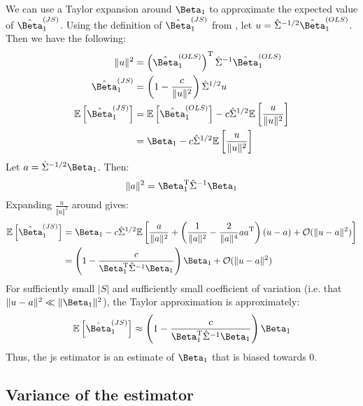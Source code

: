 We can use a Taylor expansion around $\Beta_1$ to approximate the expected value of $\hat{\Beta}_1^{(JS)}$.
Using the definition of $\hat{\Beta}_1^{(JS)}$ from , let $u = \hat{\Sigma}^{-1/2}\hat{\Beta}_1^{(OLS)}$.
Then we have the following:
%
\begin{align}
  \Vert u \Vert ^2                & = \left( \hat{\Beta}_1^{(OLS)} \right) ^\tran \hat{\Sigma}^{-1} \hat{\Beta}_1^{(OLS)}          \\
  \hat{\Beta}_1^{(JS)}            & = \left( 1 - \frac{c}{\Vert u \Vert ^2} \right) \hat{\Sigma}^{1/2} u                           \\
  \expect{ \hat{\Beta}_1^{(JS)} } & = \expect{ \hat{\Beta}_1^{(OLS)} } - c\hat{\Sigma}^{1/2} \expect{ \frac{u}{\Vert u \Vert ^2} } \\
                                  & = \Beta_1 - c\hat{\Sigma}^{1/2}\expect{ \frac{u}{\Vert u \Vert ^2} }
\end{align}
%
Let $a = \hat{\Sigma}^{-1/2}\Beta_1$.
Then:
\begin{equation}
  \Vert a \Vert ^2 = \Beta_1^\tran \hat{\Sigma}^{-1} \Beta_1
\end{equation}
%
Expanding $\frac{u}{\Vert u \Vert ^2}$ around gives:
%
\begin{align}
  \expect{ \hat{\Beta}_1^{(JS)} }
   & = \Beta_1 - c\hat{\Sigma}^{1/2}\expect{
    \frac{a}{\Vert a \Vert ^2}
    + \left( \frac{1}{\Vert a \Vert ^2} - \frac{2}{\Vert a \Vert ^4} aa^\tran \right)(u - a)
    + \mathcal{O}(\Vert u - a \Vert ^2)
  }                                                                                \\
   & = \left(1 - \frac{c}{\Beta_1^\tran \hat{\Sigma}^{-1} \Beta_1} \right) \Beta_1
  + \mathcal{O}(\Vert u - a \Vert ^2)
\end{align}
%
For sufficiently small $|S|$ and sufficiently small coefficient of variation (i.e. that $\Vert u - a \Vert ^2 \ll \Vert \Beta_1 \Vert ^2$), the Taylor approximation is approximately:
%
\begin{equation}
  \expect{ \hat{\Beta}_1^{(JS)} } \approx \left(1 - \frac{c}{\Beta_1^\tran \hat{\Sigma}^{-1} \Beta_1} \right) \Beta_1
\end{equation}
%
Thus, the \gls{js} estimator is an estimate of $\Beta_1$ that is biased towards 0.

\subsection{Variance of the  estimator}

